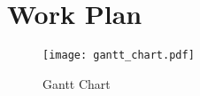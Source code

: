 \documentclass[12pt,a4paper,final]{article}
\begin{document}
\newpage
\section{Work Plan}

\begin{figure}[H]
    \caption{Gantt Chart}
    \centering
    \texttt{[image: gantt\_chart.pdf]}
    \label{fig:ganttChart}
\end{figure}

\printbibliography[heading=bibintoc, title={References}]
\end{document}
